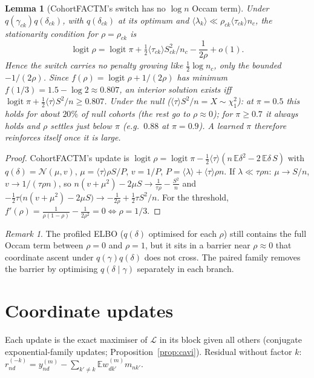 \documentclass[11pt,a4paper]{article}
\newcommand{\E}{\mathbb{E}}
\newcommand{\N}{\mathcal{N}}
\newcommand{\logit}{\operatorname{logit}}
\newcommand{\ELBO}{\mathcal{L}}
\newtheorem{lemma}{Lemma}
\theoremstyle{definition}
\theoremstyle{remark}
\newtheorem*{remark}{Remark}
\begin{document}
\begin{lemma}[CohortFACTM's switch has no $\log n$ Occam term]\label{lem:noocc}
Under $q(\gamma_{ck})q(\delta_{ck})$, with $q(\delta_{ck})$ at its optimum and $\langle\lambda_k\rangle\ll\rho_{ck}\langle\tau_{ck}\rangle n_c$, the
stationarity condition for $\rho=\rho_{ck}$ is
\[\logit\rho=\logit\pi+\tfrac12\langle\tau_{ck}\rangle S_{ck}^2/n_c-\frac{1}{2\rho}+o(1).\]
Hence the switch carries no penalty growing like $\tfrac12\log n_c$, only the bounded $-1/(2\rho)$. Since
$f(\rho)=\logit\rho+1/(2\rho)$ has minimum $f(1/3)=1.5-\log2\approx0.807$, an interior solution exists iff
$\logit\pi+\tfrac12\langle\tau\rangle S^2/n\ge0.807$. Under the null ($\langle\tau\rangle S^2/n=X\sim\chi^2_1$): at $\pi=0.5$ this holds for
about $20\%$ of null cohorts (the rest go to $\rho\approx0$); for $\pi\ge0.7$ it always holds and $\rho$ settles just below
$\pi$ (e.g.\ $0.88$ at $\pi=0.9$). A learned $\pi$ therefore reinforces itself once it is large.
\end{lemma}
\begin{proof}
CohortFACTM's update is $\logit\rho=\logit\pi-\tfrac12\langle\tau\rangle(n\,\E\delta^2-2\,\E\delta\,S)$ with $q(\delta)=\N(\mu,v)$,
$\mu=\langle\tau\rangle\rho S/P$, $v=1/P$, $P=\langle\lambda\rangle+\langle\tau\rangle\rho n$. If $\lambda\ll\tau\rho n$: $\mu\to S/n$, $v\to1/(\tau\rho n)$, so
$n(v+\mu^2)-2\mu S\to\frac{1}{\tau\rho}-\frac{S^2}{n}$ and $-\tfrac12\tau\big(n(v+\mu^2)-2\mu S\big)\to-\frac1{2\rho}+\tfrac12\tau S^2/n$. For the
threshold, $f'(\rho)=\frac{1}{\rho(1-\rho)}-\frac1{2\rho^2}=0\iff\rho=1/3$. \qedhere
\end{proof}
\begin{remark}
The profiled ELBO ($q(\delta)$ optimised for each $\rho$) still contains the full Occam term between $\rho=0$ and $\rho=1$,
but it sits in a barrier near $\rho\approx0$ that coordinate ascent under $q(\gamma)q(\delta)$ does not cross. The paired
family removes the barrier by optimising $q(\delta\mid\gamma)$ separately in each branch.
\end{remark}

\section{Coordinate updates}
Each update is the exact maximiser of $\ELBO$ in its block given all others (conjugate exponential-family updates;
Proposition~\ref{prop:cavi}). Residual without factor $k$: $r^{(-k)}_{nd}=y^{(m)}_{nd}-\sum_{k'\neq k}\E w^{(m)}_{dk'}m_{nk'}$.
\end{document}
